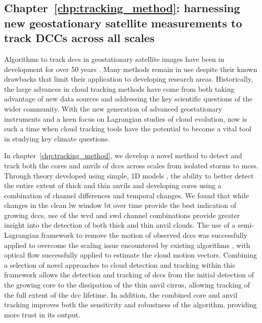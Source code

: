 \subsection{Chapter~\ref{chp:tracking_method}: harnessing new geostationary satellite measurements to track DCCs across all scales}

Algorithms to track \acrshort{dcc}s in geostationary satellite images have been in development for over 50 years \citep{menzel_cloud_2001}.
Many methods remain in use despite their known drawbacks \citep{augustine_mesoscale_1988} that limit their application to developing research areas.
Historically, the large advances in cloud tracking methods have come from both taking advantage of new data sources and addressing the key scientific questions of the wider community.
With the new generation of advanced geostationary instruments and a keen focus on Lagrangian studies of cloud evolution, now is such a time when cloud tracking tools have the potential to become a vital tool in studying key climate questions.

In chapter~\ref{chp:tracking_method}, we develop a novel method to detect and track both the cores and anvils of \acrshort{dcc}s across scales from isolated storms to \acrshort{mcs}s.
Through theory developed using simple, 1D models \citep{emde_libradtran_2016}, the ability to better detect the entire extent of thick and thin anvils and developing cores using a combination of channel differences and temporal changes.
We found that while changes in the clean \acrshort{lw} window \acrshort{bt} over time provide the best indication of growing \acrshort{dcc}s, use of the \acrshort{wvd} and \acrshort{swd} channel combinations provide greater insight into the detection of both thick and thin anvil clouds.
The use of a semi-Lagrangian framework to remove the motion of observed \acrshort{dcc}s was successfully applied to overcome the scaling issue encountered by existing algorithms \citep{lakshmanan_objective_2009}, with optical flow successfully applied to estimate the cloud motion vectors.
Combining a selection of novel approaches to cloud detection and tracking \citep{muller_novel_2019, fiolleau_algorithm_2013, zinner_cb-tram_2008} within this framework allows the detection and tracking of \acrshort{dcc}s from the initial detection of the growing core to the dissipation of the thin anvil cirrus, allowing tracking of the full extent of the \acrshort{dcc} lifetime.
In addition, the combined core and anvil tracking improves both the sensitivity and robustness of the algorithm, providing more trust in its output.

